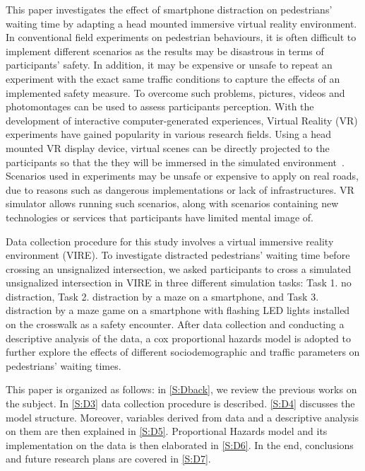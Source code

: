 This paper investigates the effect of smartphone distraction on pedestrians’ waiting time by adapting a head mounted immersive virtual reality environment. In conventional field experiments on pedestrian behaviours, it is often difficult to implement different scenarios as the results may be disastrous in terms of participants’ safety. In addition, it may be expensive or unsafe to repeat an experiment with the exact same traffic conditions to capture the effects of an implemented safety measure. To overcome such problems, pictures, videos and photomontages can be used to assess participants perception. With the development of interactive computer-generated experiences, Virtual Reality (VR) experiments have gained popularity in various research fields. Using a head mounted VR display device, virtual scenes can be directly projected to the participants so that the they will be immersed in the simulated environment~\cite{farooq2018virtual}. Scenarios used in experiments may be unsafe or expensive to apply on real roads, due to reasons such as dangerous implementations or lack of infrastructures. VR simulator allows running such scenarios, along with scenarios containing new technologies or services that participants have limited mental image of.

Data collection procedure for this study involves a virtual immersive reality environment (VIRE). To investigate distracted pedestrians’ waiting time before crossing an unsignalized intersection, we asked participants to cross a simulated unsignalized intersection in VIRE in three different simulation tasks: Task 1. no distraction, Task 2. distraction by a maze on a smartphone, and Task 3. distraction by a maze game on a smartphone with flashing LED lights installed on the crosswalk as a safety encounter. After data collection and conducting a descriptive analysis of the data, a cox proportional hazards model is adopted to further explore the effects of different sociodemographic and traffic parameters on pedestrians’ waiting times.

This paper is organized as follows: in \cref{S:Dback}, we review the previous works on the subject. In \cref{S:D3} data collection procedure is described. \cref{S:D4} discusses the model structure. Moreover, variables derived from data and a descriptive analysis on them are then explained in \cref{S:D5}. Proportional Hazards model and its implementation on the data is then elaborated in \cref{S:D6}. In the end, conclusions and future research plans are covered in \cref{S:D7}.

